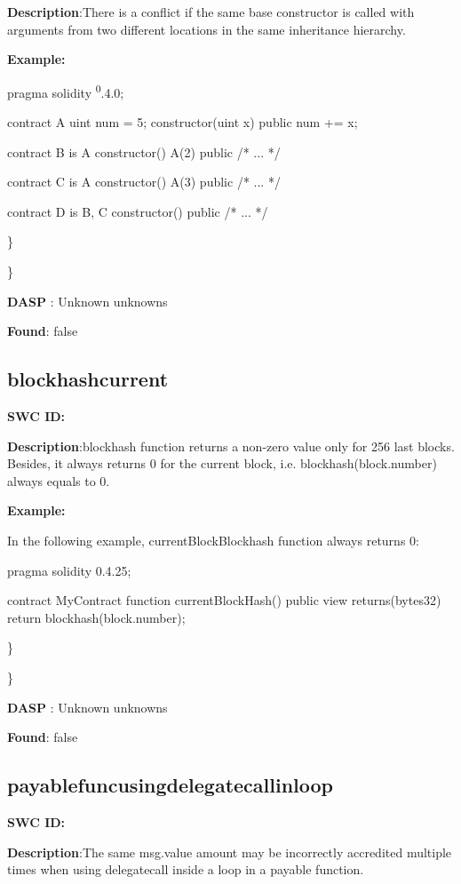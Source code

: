 \documentclass{article}
\begin{document}
{{\textbf{Description}:There is a conflict if the same base constructor is called with arguments from two different locations in the same inheritance hierarchy.


\textbf{Example:} 

pragma solidity \textsuperscript0.4.0;

contract A{
    uint num = 5;
    constructor(uint x) public{
        num += x;
    }
}

contract B is A{
    constructor() A(2) public { /* ... */ }
}

contract C is A {
    constructor() A(3) public { /* ... */ }
}

contract D is B, C {
    constructor() public { /* ... */ }
}

\} 

\} 

\textbf{DASP} : Unknown unknowns

\textbf{Found}: false

\subsection{blockhash\textunderscore current} 
\textbf{SWC \textunderscore ID:} 

\textbf{Description}:blockhash function returns a non-zero value only for 256 last blocks. Besides, it always returns 0 for the current block, i.e. blockhash(block.number) always equals to 0.


\textbf{Example:} 

In the following example, currentBlockBlockhash function always returns 0:

pragma solidity 0.4.25;

contract MyContract {
    function currentBlockHash() public view returns(bytes32) {
        return blockhash(block.number);
    }
}

\} 

\} 

\textbf{DASP} : Unknown unknowns

\textbf{Found}: false

\subsection{payable\textunderscore func\textunderscore using\textunderscore delegatecall\textunderscore in\textunderscore loop} 
\textbf{SWC \textunderscore ID:} 

\textbf{Description}:The same msg.value amount may be incorrectly accredited multiple times when using delegatecall inside a loop in a payable function.


}}
\end{document}
